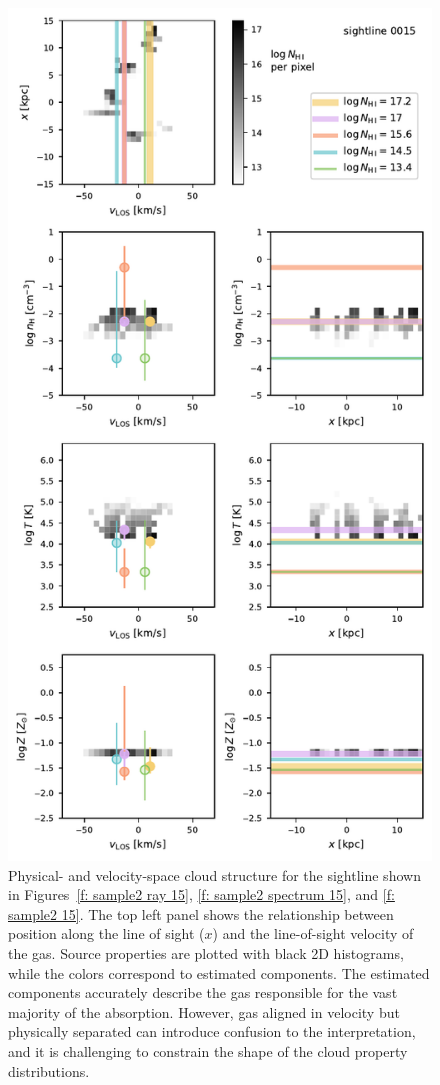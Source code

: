 \documentclass[fleqn,usenatbib]{mnras}
\begin{document}
\begin{figure}
    \centering
    \includegraphics[width=\columnwidth]{figures/sample2/high-z/component_structure_0015.pdf}
    \caption{
    Physical- and velocity-space cloud structure for the sightline shown in Figures~\ref{f: sample2 ray 15}, \ref{f: sample2 spectrum 15}, and \ref{f: sample2 15}.
    The top left panel shows the relationship between position along the line of sight ($x$) and the line-of-sight velocity of the gas.
    Source properties are plotted with black 2D histograms,
    while the colors correspond to estimated components.
    The estimated components accurately describe the gas responsible for the vast majority of the absorption.
    However, gas aligned in velocity but physically separated can introduce confusion to the interpretation,
    and it is challenging to constrain the shape of the cloud property distributions.
    }
    \label{f: sample2 structure 15}
\end{figure}
\end{document}
